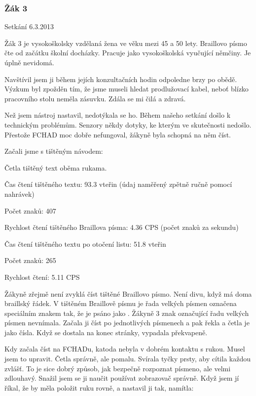 \subsubsection{Žák 3}

Setkání 6.3.2013

Žák 3 je vysokoškolsky vzdělaná žena ve věku mezi 45 a 50 lety. Braillovo písmo čte od začátku školní docházky.  Pracuje jako vysokoškolská vyučující němčiny.  Je úplně nevidomá.

Navštívil jsem ji během jejích konzultačních hodin odpoledne brzy po obědě.  Výzkum byl zpožděn tím, že jsme museli hledat prodlužovací kabel, neboť blízko pracovního stolu neměla zásuvku.  Zdála se mi čilá a zdravá.

Než jsem nástroj nastavil, nedotýkala se ho. Během našeho setkání došlo k technickým problémům. Senzory někdy  dotyky, ke kterým ve skutečnosti nedošlo.  Přestože FCHAD moc dobře nefungoval, žákyně byla schopná na něm číst.

Začali jsme s tištěným návodem:

Četla tištěný text oběma rukama.

Čas čtení tištěného textu: 93.3 vteřin (údaj naměřený zpětně ručně pomocí nahrávek)

Počet znaků: 407

Rychlost čtení tištěného Braillova písma: 4.36 CPS (počet znaků za sekundu)

Čas čtení tištěného textu po otočení listu: 51.8 vteřin

Počet znaků: 265

Rychlost čtení: 5.11 CPS

Žákyně zřejmě není zvyklá číst tištěné Braillovo písmo.  Není divu, když má doma braillský řádek.  V tištěném Braillově písmu je řada velkých písmen označena speciálním znakem  tak, že  je psáno jako . Žákyně 3 znak označující řadu velkých písmen nevnímala.  Začala ji číst po jednotlivých písmenech a pak řekla  a četla je jako čísla.  Když se dostala na konec stránky, vypadala překvapeně.

Kdy začala číst na FCHADu, katoda nebyla v dobrém kontaktu s rukou.  Musel jsem to upravit.  Četla správně, ale pomalu. Svírala tyčky prsty, aby cítila každou zvlášť.  To je sice dobrý způsob, jak bezpečně rozpoznat písmeno, ale velmi zdlouhavý. Snažil jsem se ji naučit používat zobrazovač správně.  Když jsem jí říkal, že by měla položit ruku rovně, a nastavil ji tak, namítla:  %


